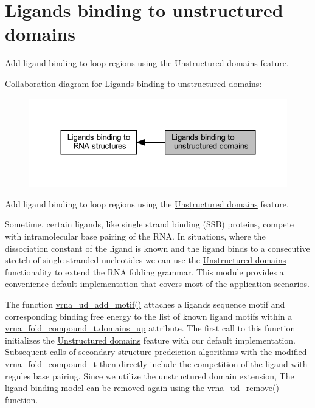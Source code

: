 \hypertarget{group__ligands__up}{}\section{Ligands binding to unstructured domains}
\label{group__ligands__up}


Add ligand binding to loop regions using the \hyperlink{group__domains__up}{Unstructured domains} feature.  


Collaboration diagram for Ligands binding to unstructured domains\+:
\nopagebreak
\begin{figure}[H]
\begin{center}
\leavevmode
\includegraphics[width=324pt]{group__ligands__up}
\end{center}
\end{figure}
Add ligand binding to loop regions using the \hyperlink{group__domains__up}{Unstructured domains} feature. 

Sometime, certain ligands, like single strand binding (S\+SB) proteins, compete with intramolecular base pairing of the R\+NA. In situations, where the dissociation constant of the ligand is known and the ligand binds to a consecutive stretch of single-\/stranded nucleotides we can use the \hyperlink{group__domains__up}{Unstructured domains} functionality to extend the R\+NA folding grammar. This module provides a convenience default implementation that covers most of the application scenarios.

The function \hyperlink{group__domains__up_gaec0c3313fb2951946614f920d289829a}{vrna\+\_\+ud\+\_\+add\+\_\+motif()} attaches a ligands sequence motif and corresponding binding free energy to the list of known ligand motifs within a \hyperlink{group__fold__compound_a4f70b6d32681fc8ca061236f21819ae7}{vrna\+\_\+fold\+\_\+compound\+\_\+t.\+domains\+\_\+up} attribute. The first call to this function initializes the \hyperlink{group__domains__up}{Unstructured domains} feature with our default implementation. Subsequent calls of secondary structure predciction algorithms with the modified \hyperlink{group__fold__compound_ga1b0cef17fd40466cef5968eaeeff6166}{vrna\+\_\+fold\+\_\+compound\+\_\+t} then directly include the competition of the ligand with regules base pairing. Since we utilize the unstructured domain extension, The ligand binding model can be removed again using the \hyperlink{group__domains__up_gada59cb0c498b812eadd010811af3f2d4}{vrna\+\_\+ud\+\_\+remove()} function. 